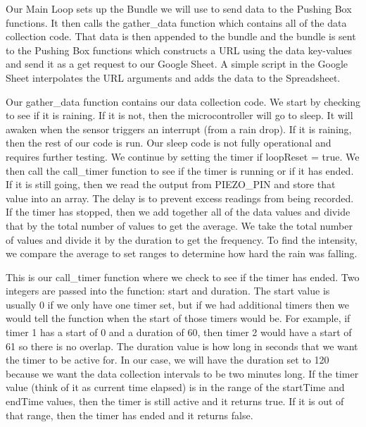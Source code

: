 \documentclass[letterpaper,10pt,draftclsnofoot,onecolumn]{article}
\begin{document}
\vspace{4mm}


\vspace{4mm}
Our Main Loop sets up the Bundle we will use to send data to the Pushing Box functions. It then calls the gather\_data function which contains all of the data collection code. That data is then appended to the bundle and the bundle is sent to the Pushing Box functions which constructs a URL using the data key-values and send it as a get request to our Google Sheet. A simple script in the Google Sheet interpolates the URL arguments and adds the data to the Spreadsheet.

\vspace{4mm}


\vspace{4mm}
Our gather\_data function contains our data collection code. We start by checking to see if it is raining. If it is not, then the microcontroller will go to sleep. It will awaken when the sensor triggers an interrupt (from a rain drop). If it is raining, then the rest of our code is run. Our sleep code is not fully operational and requires further testing.
\newline
\newline
We continue by setting the timer if loopReset = true. We then call the call\_timer function to see if the timer is running or if it has ended. If it is still going, then we read the output from PIEZO\_PIN and store that value into an array. The delay is to prevent excess readings from being recorded.
\newline
\newline
If the timer has stopped, then we add together all of the data values and divide that by the total number of values to get the average. We take the total number of values and divide it by the duration to get the frequency. To find the intensity, we compare the average to set ranges to determine how hard the rain was falling. 

\vspace{4mm}


\vspace{4mm}
This is our call\_timer function where we check to see if the timer has ended. Two integers are passed into the function: start and duration. The start value is usually 0 if we only have one timer set, but if we had additional timers then we would tell the function when the start of those timers would be. For example, if timer 1 has a start of 0 and a duration of 60, then timer 2 would have a start of 61 so there is no overlap. The duration value is how long in seconds that we want the timer to be active for. In our case, we will have the duration set to 120 because we want the data collection intervals to be two minutes long. If the timer value (think of it as current time elapsed) is in the range of the startTime and endTime values, then the timer is still active and it returns true. If it is out of that range, then the timer has ended and it returns false.
\end{document}
